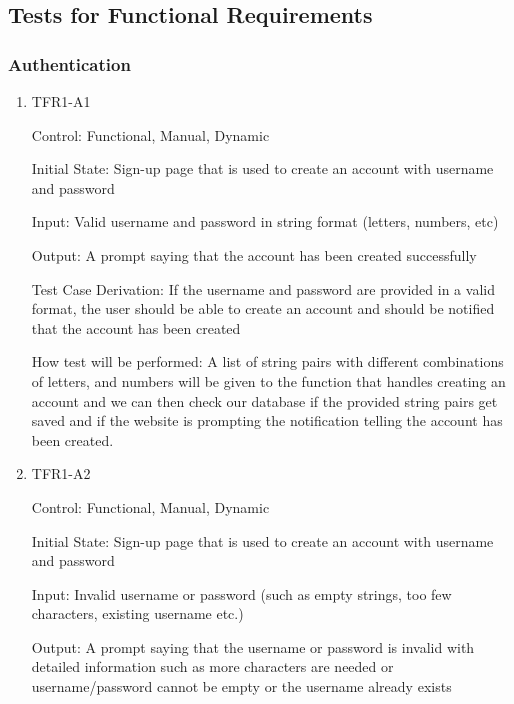 \documentclass[12pt, titlepage]{article}
\begin{document}
\subsection{Tests for Functional Requirements}



  \subsubsection{Authentication}

  \begin{enumerate}
            
  \item{TFR1-A1\\}
  
  Control: Functional, Manual, Dynamic
            
  Initial State: Sign-up page that is used to create an account with username and password
            
  Input: Valid username and password in string format (letters, numbers, etc)
            
  Output: A prompt saying that the account has been created successfully
  
  Test Case Derivation: If the username and password are provided in a valid format, the user should be able to create an account and should be notified that the account has been created
  
  How test will be performed: A list of string pairs with different combinations of letters, and numbers will be given to the function that handles creating an account and we can then check our database if the provided string pairs get saved and if the website is prompting the notification telling the account has been created. 
  
  \item{TFR1-A2\\}
  
  Control: Functional, Manual, Dynamic
            
  Initial State: Sign-up page that is used to create an account with username and password
            
  Input: Invalid username or password (such as empty strings, too few characters, existing username etc.)
            
  Output: A prompt saying that the username or password is invalid with detailed information such as more characters are needed or username/password cannot be empty or the username already exists
  

\end{enumerate}
\end{document}
